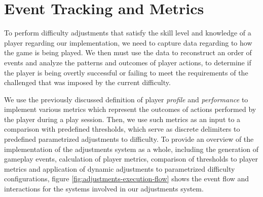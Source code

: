 





\section{Event Tracking and Metrics}

To perform difficulty adjustments that satisfy the skill level and knowledge of a player regarding our implementation, we need to capture data regarding to how the game is being played. We then must use the data to reconstruct an order of events and analyze the patterns and outcomes of player actions, to determine if the player is being overtly successful or failing to meet the requirements of the challenged that was imposed by the current difficulty.

We use the previously discussed definition of player \emph{profile} and \emph{performance} to implement various metrics which represent the outcomes of actions performed by the player during a play session. Then, we use such metrics as an input to a comparison with predefined thresholds, which serve as discrete delimiters to predefined parametrized adjustments to difficulty. To provide an overview of the implementation of the adjustments system as a whole, including the generation of gameplay events, calculation of player metrics, comparison of thresholds to player metrics and application of dynamic adjustments to parametrized difficulty configurations, figure \ref{fig:adjustments-execution-flow} shows the event flow and interactions for the systems involved in our adjustments system.

